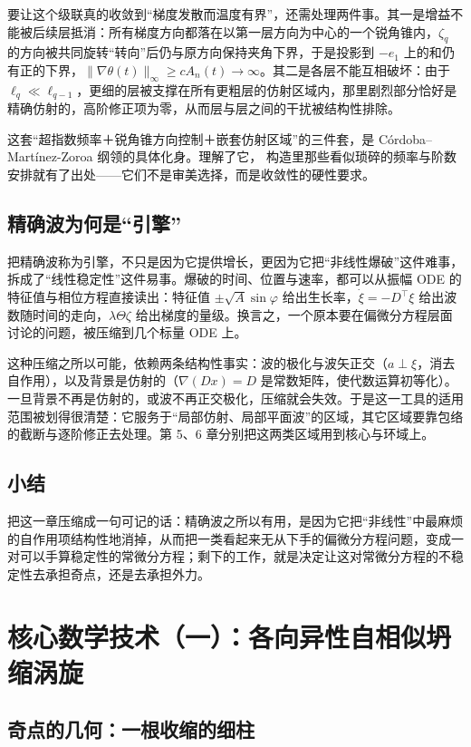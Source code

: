 要让这个级联真的收敛到“梯度发散而温度有界”，还需处理两件事。其一是增益不能被后续层抵消：所有梯度方向都落在以第一层方向为中心的一个锐角锥内，$\zeta_{q}$ 的方向被共同旋转“转向”后仍与原方向保持夹角下界，于是投影到 $-e_{1}$ 上的和仍有正的下界，$\|\nabla\theta(t)\|_{\infty}\ge cA_{n}(t)\to\infty$。其二是各层不能互相破坏：由于 $\ell_{q}\ll\ell_{q-1}$，更细的层被支撑在所有更粗层的仿射区域内，那里剧烈部分恰好是精确仿射的，高阶修正项为零，从而层与层之间的干扰被结构性排除。

这套“超指数频率＋锐角锥方向控制＋嵌套仿射区域”的三件套，是 Córdoba--Martínez-Zoroa 纲领的具体化身。理解了它，\NS{} 构造里那些看似琐碎的频率与阶数安排就有了出处——它们不是审美选择，而是收敛性的硬性要求。

\subsection{精确波为何是“引擎”}

把精确波称为引擎，不只是因为它提供增长，更因为它把“非线性爆破”这件难事，拆成了“线性稳定性”这件易事。爆破的时间、位置与速率，都可以从振幅 ODE 的特征值与相位方程直接读出：特征值 $\pm\sqrt{A}\sin\varphi$ 给出生长率，$\dot\xi=-D^{\top}\xi$ 给出波数随时间的走向，$\lambda\Theta\zeta$ 给出梯度的量级。换言之，一个原本要在偏微分方程层面讨论的问题，被压缩到几个标量 ODE 上。

这种压缩之所以可能，依赖两条结构性事实：波的极化与波矢正交（$a\perp\xi$，消去自作用），以及背景是仿射的（$\nabla(Dx)=D$ 是常数矩阵，使代数运算初等化）。一旦背景不再是仿射的，或波不再正交极化，压缩就会失效。于是这一工具的适用范围被划得很清楚：它服务于“局部仿射、局部平面波”的区域，其它区域要靠包络的截断与逐阶修正去处理。第 5、6 章分别把这两类区域用到核心与环域上。

\subsection{小结}

把这一章压缩成一句可记的话：精确波之所以有用，是因为它把“非线性”中最麻烦的自作用项结构性地消掉，从而把一类看起来无从下手的偏微分方程问题，变成一对可以手算稳定性的常微分方程；剩下的工作，就是决定让这对常微分方程的不稳定性去承担奇点，还是去承担外力。

\section{核心数学技术（一）：各向异性自相似坍缩涡旋}

\subsection{奇点的几何：一根收缩的细柱}


